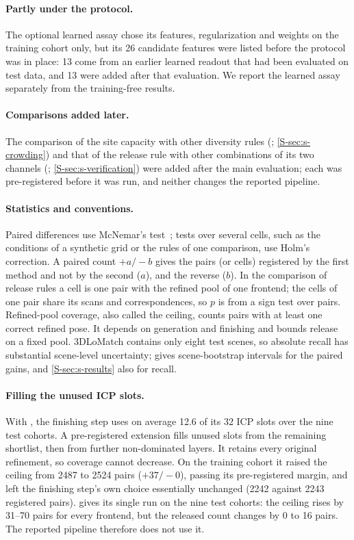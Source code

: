 \paragraph{Partly under the protocol.} The optional learned assay chose its features, regularization and weights on the training cohort only, but its 26 candidate features were listed before the protocol was in place: 13 come from an earlier learned readout that had been evaluated on test data, and 13 were added after that evaluation. We report the learned assay separately from the training-free results.

\paragraph{Comparisons added later.} The comparison of the site capacity with other diversity rules (; \cref{S-sec:s-crowding}) and that of the release rule with other combinations of its two channels (; \cref{S-sec:s-verification}) were added after the main evaluation; each was pre-registered before it was run, and neither changes the reported pipeline.

\paragraph{Statistics and conventions.} Paired differences use McNemar's test~\cite{mcnemar1947}; tests over several cells, such as the conditions of a synthetic grid or the rules of one comparison, use Holm's correction. A paired count $+a/{-}b$ gives the pairs (or cells) registered by the first method and not by the second ($a$), and the reverse ($b$). In the comparison of release rules a cell is one pair with the refined pool of one frontend; the cells of one pair share its scans and correspondences, so $p$ is from a sign test over pairs. Refined-pool coverage, also called the ceiling, counts pairs with at least one correct refined pose. It depends on generation and finishing and bounds release on a fixed pool. 3DLoMatch contains only eight test scenes, so absolute recall has substantial scene-level uncertainty;  gives scene-bootstrap intervals for the paired gains, and \cref{S-sec:s-results} also for recall.

\paragraph{Filling the unused ICP slots.} With \ls{}, the finishing step uses on average 12.6 of its 32 ICP slots over the nine test cohorts. A pre-registered extension fills unused slots from the remaining shortlist, then from further non-dominated layers. It retains every original refinement, so coverage cannot decrease. On the training cohort it raised the ceiling from 2487 to 2524 pairs ($+37/{-}0$), passing its pre-registered margin, and left the finishing step's own choice essentially unchanged (2242 against 2243 registered pairs).  gives its single run on the nine test cohorts: the ceiling rises by 31--70 pairs for every frontend, but the released count changes by 0 to 16 pairs. The reported pipeline therefore does not use it.

